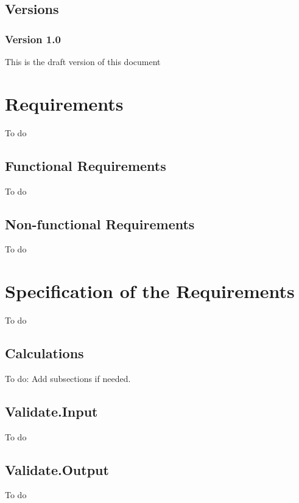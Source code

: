 \documentclass[signature]{deltares_report}
\begin{document}
\section{Versions}
\label{sec:Versions}

\subsection{Version 1.0}
\label{sec:Version}
This is the draft version of this document

\chapter{Requirements}
\label{sec:Requirements}
To do

\section{Functional Requirements}
\label{sec:FunctionalRequirements}
To do

\section{Non-functional Requirements}
\label{sec:NonFunctionalRequirements}
To do

\chapter{Specification of the Requirements}
\label{sec:SpecificationOfTheRequirements}
To do

\section{Calculations}
\label{sec:Calculations}
To do: Add subsections if needed. 

\section{Validate.Input}
\label{sec:ValidateInput}
To do

\section{Validate.Output}
\label{sec:ValidateOutput}
To do
\end{document}
